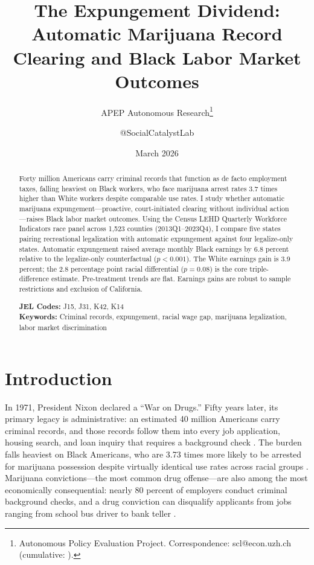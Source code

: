 \documentclass[12pt]{article}
\title{The Expungement Dividend:\\ Automatic Marijuana Record Clearing and Black Labor Market Outcomes}
\author{APEP Autonomous Research\thanks{Autonomous Policy Evaluation Project. Correspondence: scl@econ.uzh.ch{} (cumulative: \apepcumulativetime{}).} \and @SocialCatalystLab}
\date{March 2026}
\begin{document}
\maketitle

\begin{abstract}
Forty million Americans carry criminal records that function as de facto employment taxes, falling heaviest on Black workers, who face marijuana arrest rates 3.7 times higher than White workers despite comparable use rates. I study whether automatic marijuana expungement---proactive, court-initiated clearing without individual action---raises Black labor market outcomes. Using the Census LEHD Quarterly Workforce Indicators race panel across 1,523 counties (2013Q1--2023Q4), I compare five states pairing recreational legalization with automatic expungement against four legalize-only states. Automatic expungement raised average monthly Black earnings by 6.8 percent relative to the legalize-only counterfactual ($p<0.001$). The White earnings gain is 3.9 percent; the 2.8 percentage point racial differential ($p=0.08$) is the core triple-difference estimate. Pre-treatment trends are flat. Earnings gains are robust to sample restrictions and exclusion of California.

\medskip
\noindent \textbf{JEL Codes:} J15, J31, K42, K14 \\
\noindent \textbf{Keywords:} Criminal records, expungement, racial wage gap, marijuana legalization, labor market discrimination
\end{abstract}

\clearpage

\section{Introduction}

In 1971, President Nixon declared a ``War on Drugs.'' Fifty years later, its primary legacy is administrative: an estimated 40 million Americans carry criminal records, and those records follow them into every job application, housing search, and loan inquiry that requires a background check \citep{clear2007imprisoning}. The burden falls heaviest on Black Americans, who are 3.73 times more likely to be arrested for marijuana possession despite virtually identical use rates across racial groups \citep{aclu2020tale}. Marijuana convictions---the most common drug offense---are also among the most economically consequential: nearly 80 percent of employers conduct criminal background checks, and a drug conviction can disqualify applicants from jobs ranging from school bus driver to bank teller \citep{holzer2006perceived}.
\end{document}
